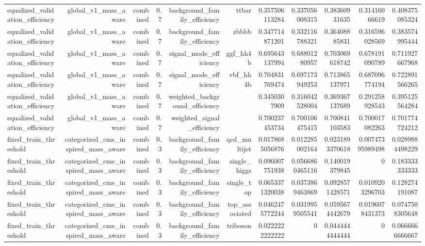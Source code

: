 \begin{table}[htbp]
{\begin{tabular}{lrrrrrrrrrr}
equalized\_validation\_efficiency & global\_v1\_mass\_aware & combined & 0.7 & background\_family\_efficiency & ttbar & 0.357506113284 & 0.337056008315 & 0.38360931635 & 0.31416066619 & 0.408375085324 \\
equalized\_validation\_efficiency & global\_v1\_mass\_aware & combined & 0.7 & background\_family\_efficiency & zbbbb & 0.347714871201 & 0.332116788321 & 0.36408885831 & 0.316596028569 & 0.383574995444 \\
equalized\_validation\_efficiency & global\_v1\_mass\_aware & combined & 0.7 & signal\_mode\_efficiency & ggf\_hh4b & 0.695643137994 & 0.68801280957 & 0.703069618742 & 0.678191090789 & 0.711927667968 \\
equalized\_validation\_efficiency & global\_v1\_mass\_aware & combined & 0.7 & signal\_mode\_efficiency & vbf\_hh4b & 0.704831769474 & 0.697173949253 & 0.713865137971 & 0.687096774194 & 0.722891566265 \\
equalized\_validation\_efficiency & global\_v1\_mass\_aware & combined & 0.7 & weighted\_background\_efficiency &  & 0.3450307909 & 0.316042528004 & 0.369367137689 & 0.291258928543 & 0.395125564284 \\
equalized\_validation\_efficiency & global\_v1\_mass\_aware & combined & 0.7 & weighted\_signal\_efficiency &  & 0.700237453734 & 0.700106475415 & 0.700841103583 & 0.700017082263 & 0.701774724212 \\
fixed\_train\_threshold & categorized\_cms\_inspired\_mass\_aware & combined & 0.3 & background\_family\_efficiency & qcd\_multijet & 0.0178685056876 & 0.012285002164 & 0.0231893370618 & 0.00747395989498 & 0.0289884498229 \\
fixed\_train\_threshold & categorized\_cms\_inspired\_mass\_aware & combined & 0.3 & background\_family\_efficiency & single\_higgs & 0.096007751938 & 0.0566860465116 & 0.140019379845 & 0 & 0.183333333333 \\
fixed\_train\_threshold & categorized\_cms\_inspired\_mass\_aware & combined & 0.3 & background\_family\_efficiency & single\_top & 0.0653371320038 & 0.0373869463869 & 0.0928571428571 & 0.0109203296703 & 0.128274191087 \\
fixed\_train\_threshold & categorized\_cms\_inspired\_mass\_aware & combined & 0.3 & background\_family\_efficiency & top\_associated & 0.0462475772244 & 0.0319959505541 & 0.0595674442679 & 0.0196078431373 & 0.0747508305648 \\
fixed\_train\_threshold & categorized\_cms\_inspired\_mass\_aware & combined & 0.3 & background\_family\_efficiency & triboson & 0.0222222222222 & 0 & 0.0444444444444 & 0 & 0.0666666666667 \\

\end{tabular}}
\end{table}
